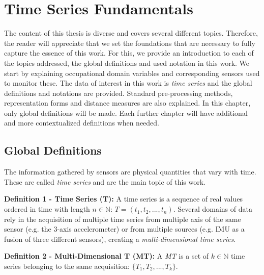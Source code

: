 
%

\chapter{Time Series Fundamentals}
\label{cha:theory}

The content of this thesis is diverse and covers several different topics. Therefore, the reader will appreciate that we set the foundations that are necessary to fully capture the essence of this work. For this, we provide an introduction to each of the topics addressed, the global definitions and used notation in this work. We start by explaining occupational domain variables and corresponding sensors used to monitor these. The data of interest in this work is \textit{time series} and the global definitions and notations are provided. Standard pre-processing methods, representation forms and distance measures are also explained. In this chapter, only global definitions will be made. Each further chapter will have additional and more contextualized definitions when needed.

\section{Global Definitions}
\label{sec:global}

The information gathered by sensors are physical quantities that vary with time. These are called \textit{time series} and are the main topic of this work.


    \item \textbf{Definition 1 - Time Series (T):} A time series is a sequence of real values ordered in time with length $n \in \mathbb{N}$: $T = (t_1, t_2, ..., t_n)$.
    Several domains of data rely in the acquisition of multiple time series from multiple axis of the same sensor (e.g. the 3-axis accelerometer) or from multiple sources (e.g. IMU as a fusion of three different sensors), creating a \textit{multi-dimensional time series}.
    
    \item \textbf{Definition 2 - Multi-Dimensional T (MT):} A \textit{MT} is a set of $k \in \mathbb{N}$ time series belonging to the same acquisition: $\{T_1, T_2, ..., T_k\}$.

